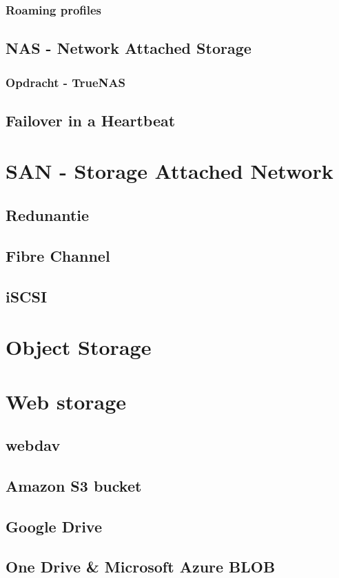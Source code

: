 \documentclass[a4paper,12pt,twoside,openright,titlepage]{book}
\begin{document}
\subsection{Roaming profiles}
\section{NAS - Network Attached Storage}

\subsection{Opdracht - TrueNAS}

\section{Failover in a Heartbeat}


\chapter{SAN - Storage Attached Network}

\section{Redunantie}

\section{Fibre Channel}

\section{iSCSI}


\chapter{Object Storage}


\chapter{Web storage}

\section{webdav}

\section{Amazon S3 bucket}
\section{Google Drive}
\section{One Drive \& Microsoft Azure BLOB}


\printindex
\end{document}
